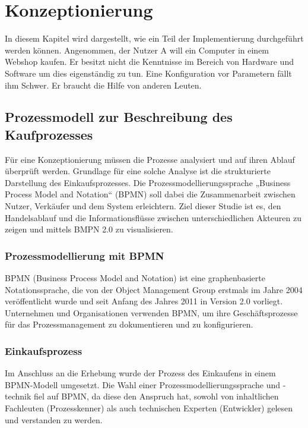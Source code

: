 
\chapter{Konzeptionierung}

In diesem Kapitel wird dargestellt, wie ein Teil der Implementierung durchgeführt werden können. Angenommen, der Nutzer A will ein Computer in einem Webshop kaufen. Er besitzt nicht die Kenntnisse im Bereich von Hardware und Software um dies eigenständig zu tun. Eine Konfiguration vor Parametern fällt ihm Schwer. Er braucht die Hilfe von anderen Leuten.


\section{Prozessmodell zur Beschreibung des Kaufprozesses}

Für eine Konzeptionierung müssen die Prozesse analysiert und auf ihren Ablauf überprüft werden. Grundlage für eine solche Analyse ist die strukturierte Darstellung des Einkaufsprozesses. Die Prozessmodellierungssprache „Business Process Model and Notation“ (BPMN) soll dabei die Zusammenarbeit zwischen Nutzer, Verkäufer und dem System erleichtern. Ziel dieser Studie ist es, den Handelsablauf und die Informationsflüsse zwischen unterschiedlichen Akteuren zu zeigen und mittels BMPN 2.0 zu visualisieren.


\subsection{Prozessmodellierung mit BPMN}

BPMN (Business Process Model and Notation) ist eine graphenbasierte Notationssprache, die von der Object Management Group erstmals im Jahre 2004 veröffentlicht wurde und seit Anfang des Jahres 2011 in Version 2.0 vorliegt. \parencite{bpmn} Unternehmen und Organisationen verwenden BPMN, um ihre Geschäftsprozesse für das Prozessmanagement zu dokumentieren und zu konfigurieren.


\subsection{Einkaufsprozess}

Im Anschluss an die Erhebung wurde der Prozess des Einkaufens in einem BPMN-Modell umgesetzt. Die Wahl einer Prozessmodellierungssprache und -technik fiel auf BPMN, da diese den Anspruch hat, sowohl von inhaltlichen Fachleuten (Prozesskenner) als auch technischen Experten (Entwickler) gelesen und verstanden zu werden. \parencite{allweyer}

